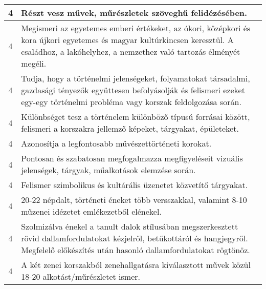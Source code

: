 \begin{longtable}{c | p{12cm} }
                                          4 &  Részt vesz művek, műrészletek szöveghű felidézésében. \\ \hline
                                          4 &  Megismeri az egyetemes emberi értékeket, az ókori, középkori és kora újkori egyetemes és magyar kultúrkincsen keresztül. A családhoz, a lakóhelyhez, a nemzethez való tartozás élményét megéli. \\ \hline
                                          4 &  Tudja, hogy a történelmi jelenségeket, folyamatokat társadalmi, gazdasági tényezők együttesen befolyásolják és felismeri ezeket egy-egy történelmi probléma vagy korszak feldolgozása során. \\ \hline
                                          4 &  Különbséget tesz a történelem különböző típusú forrásai között, felismeri a korszakra jellemző képeket, tárgyakat, épületeket. \\ \hline
                                          4 &  Azonosítja a legfontosabb művészettörténeti korokat. \\ \hline
                                          4 &  Pontosan és szabatosan megfogalmazza megfigyeléseit vizuális jelenségek, tárgyak, műalkotások elemzése során. \\ \hline
                                          4 &  Felismer szimbolikus és kultárális üzenetet közvetítő tárgyakat. \\ \hline
                                          4 &  20-22 népdalt, történeti éneket több versszakkal, valamint 8-10 műzenei idézetet emlékezetből elénekel. \\ \hline
                                          4 &  Szolmizálva énekel a tanult dalok stílusában megszerkesztett rövid dallamfordulatokat kézjelről, betűkottáról és hangjegyről. Megfelelő előkészítés után hasonló dallamfordulatokat rögtönöz. \\ \hline
                                          4 &  A két zenei korszakból zenehallgatásra kiválasztott művek közül 18-20 alkotást/műrészletet ismer. \\ \hline
                                      
                        \end{longtable}
            \clearpage

